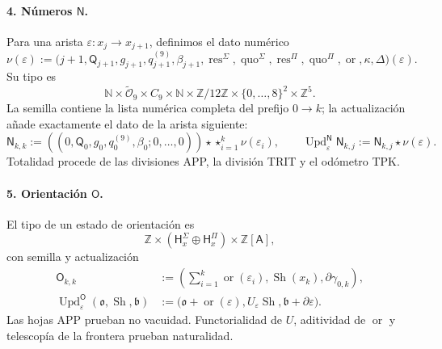\paragraph{4. Números \(\mathsf N\).}
Para una arista \(\varepsilon:x_j\to x_{j+1}\), definimos el dato numérico
\begin{equation}
\label{rm:eq:pdfv2-terminal-numero-arista}
 \nu(\varepsilon):=
 \bigl(j+1,\mathsf Q_{j+1},g_{j+1},q^{(9)}_{j+1},\beta_{j+1},
 \operatorname{res}^{\Sigma},\operatorname{quo}^{\Sigma},
 \operatorname{res}^{\Pi},\operatorname{quo}^{\Pi},
 \operatorname{or},\kappa,\Delta\bigr)(\varepsilon).
\end{equation}
Su tipo es
\[
 \mathbb N\times\widetilde{\mathcal O}_9\times C_9\times\mathbb N
 \times\mathbb Z/12\mathbb Z
 \times\{0,\ldots,8\}^2\times\mathbb Z^5.
\]
La semilla contiene la lista numérica completa del prefijo \(0\to k\);
la actualización añade exactamente el dato de la arista siguiente:
\begin{equation}
\label{rm:eq:pdfv2-terminal-update-n}
 \mathsf N_{k,k}:=
 ((0,\mathsf Q_0,g_0,q^{(9)}_0,\beta_0;0,\ldots,0))
 \star\mathop{\star}_{i=1}^{k}\nu(\varepsilon_i),\qquad
 \operatorname{Upd}^{\mathsf N}_{\varepsilon}\mathsf N_{k,j}
 :=\mathsf N_{k,j}\star\nu(\varepsilon).
\end{equation}
Totalidad procede de las divisiones APP, la división TRIT y el odómetro TPK.

\paragraph{5. Orientación \(\mathsf O\).}
El tipo de un estado de orientación es
\[
 \mathbb Z\times
 (\mathsf H^\Sigma_x\oplus\mathsf H^\Pi_x)
 \times\mathbb Z[\mathsf A],
\]
con semilla y actualización
\begin{align}
 \mathsf O_{k,k}&:=
 \left(\sum_{i=1}^{k}\operatorname{or}(\varepsilon_i),
       \operatorname{Sh}(x_k),\partial\gamma_{0,k}\right),
 \label{rm:eq:pdfv2-terminal-semilla-o}\\
 \operatorname{Upd}^{\mathsf O}_{\varepsilon}
 (\mathfrak o,\operatorname{Sh},\mathfrak b)
 &:=
 \bigl(\mathfrak o+\operatorname{or}(\varepsilon),
 U_\varepsilon\operatorname{Sh},
 \mathfrak b+\partial\varepsilon\bigr).
 \label{rm:eq:pdfv2-terminal-update-o}
\end{align}
Las hojas APP prueban no vacuidad. Functorialidad de \(U\), aditividad de
\(\operatorname{or}\) y telescopía de la frontera prueban naturalidad.

